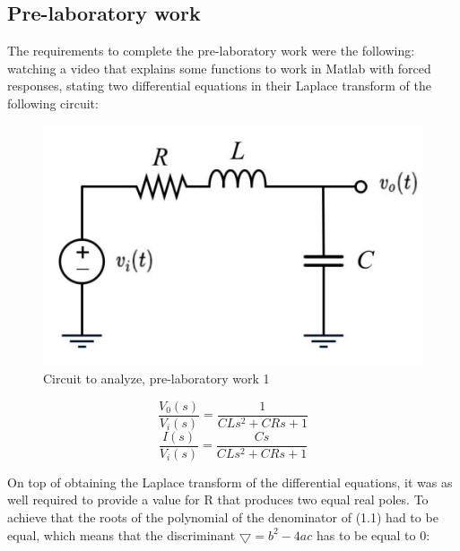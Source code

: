 \documentclass[a4paper,12pt]{article}
\begin{document}
\vspace{1cm}

\subsection{Pre-laboratory work}

\vspace{0.5cm}

The requirements to complete the pre-laboratory work were the following: watching a video that explains some functions to work in Matlab with forced responses, stating two differential equations in their Laplace transform of the following circuit:

\vspace{0.5cm}

\begin{figure}[H]
    \centering
    \includegraphics[width=0.5\linewidth]{fonts_lab_1/circuit_lab_1.png}
    \caption{Circuit to analyze, pre-laboratory work 1}
    \label{fig:Lab 1 circuit}
\end{figure}

\vspace{0.5cm}

\begin{equation}
\frac{V_0(s)}{V_i(s)} = \frac{1}{CLs^2 + CRs + 1} 
\end{equation}
\begin{equation}    
\frac{I(s)}{V_i(s)} = \frac{Cs}{CLs^2 + CRs + 1}
\end{equation}

\vspace{0.5cm}

On top of obtaining the Laplace transform of the differential equations, it was as well required to provide a value for R that produces two equal real poles. To achieve that the roots of the polynomial of the denominator of (1.1) had to be equal, which means that the discriminant \(\bigtriangledown=b^2-4ac\) has to be equal to 0:

\vspace{0.5cm}
\end{document}

